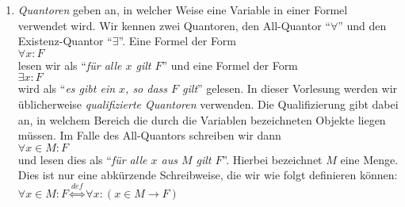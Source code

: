 \begin{enumerate}
      Die Verwendung von vielen Klammern vermindert die Lesbarkeit einer Formel.  Um
      Klammern einsparen zu k\"onnen, vereinbaren wir daher \"ahnliche Bindungsregeln, wie wir
      sie aus der Schulmathematik kennen.  Dort wurde vereinbart, dass ``$+$'' und ``$-$'' schw\"acher
      binden als  ``$\cdot $'' und ``$/$'' und damit ist gemeint, dass \\[0.2cm]
      \hspace*{1.3cm} $x + y \cdot z$  \quad als \quad $x + (y \cdot z)$ \\[0.2cm]
      interpretiert wird.  \"Ahnlich vereinbaren wir hier, dass ``$\neg$'' st\"arker bindet als ``$\wedge$''
      und ``$\vee$'' und dass diese beiden Operatoren st\"arker binden als
      ``$\rightarrow$''.  Schlie\3lich bindet der Operator ``$\leftrightarrow$'' 
      schw\"acher als alle anderen Operatoren.  Mit diesen Vereinbarungen lautet die Formel \\[0.2cm]
      \hspace*{1.3cm} $P \wedge Q \rightarrow R \leftrightarrow \neg R \rightarrow \neg P \vee \neg Q$ \\[0.2cm]
      dann in einer vollst\"andig geklammerten Schreibweise \\[0.2cm]
      \hspace*{1.3cm}  
      $\bigl((P \wedge Q) \rightarrow R\bigr) \leftrightarrow \bigl(\,(\neg R) \rightarrow ((\neg P) \vee (\neg Q))\,\bigr)$. 
      
     \item \emph{Quantoren}
      geben an, in welcher Weise eine Variable in einer Formel verwendet wird. Wir kennen zwei
      Quantoren, den All-Quantor ``$\forall$'' und den Existenz-Quantor ``$\exists$''.  Eine Formel der Form\\[0.2cm]
      \hspace*{1.3cm} $\forall x: F$ \\[0.2cm]
      lesen wir als ``\emph{f\"ur alle $x$ gilt $F$}'' und eine Formel der Form \\[0.2cm]
      \hspace*{1.3cm} $\exists x: F$ \\[0.2cm]
      wird als ``\emph{es gibt ein $x$, so dass $F$ gilt}'' gelesen.  In dieser Vorlesung
      werden wir \"ublicherweise \emph{qualifizierte Quantoren} verwenden.  Die Qualifizierung
      gibt dabei an, in welchem Bereich die durch die Variablen bezeichneten Objekte liegen m\"ussen.
      Im Falle des All-Quantors schreiben wir dann \\[0.2cm]
      \hspace*{1.3cm} $\forall x \in M: F$ \\[0.2cm]
      und lesen dies als ``\emph{f\"ur alle $x$ aus $M$ gilt $F$}''.  Hierbei bezeichnet $M$
      eine Menge. Dies ist nur eine abk\"urzende Schreibweise,
      die wir wie folgt definieren k\"onnen: \\[0.2cm]
      \hspace*{1.3cm} $\forall x \in M: F \stackrel{de\!f}{\Longleftrightarrow} \forall x\colon (x\in M \rightarrow F)$ 


\end{enumerate}
